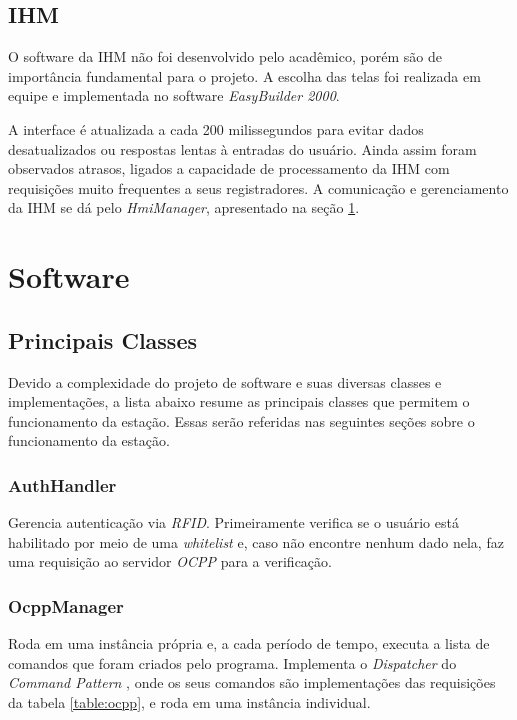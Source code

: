     \subsection{IHM}
    \label{methodology:structure:others}

      O software da \ac{IHM} não foi desenvolvido pelo acadêmico, porém são de importância fundamental para o projeto. A escolha das telas foi realizada em equipe e implementada no software \textit{EasyBuilder 2000}. {}

      A interface é atualizada a cada 200 milissegundos para evitar dados desatualizados ou respostas lentas à entradas do usuário. Ainda assim foram observados atrasos, ligados a capacidade de processamento da \ac{IHM} com requisições muito frequentes a seus registradores. A comunicação e gerenciamento da \ac{IHM} se dá pelo \textit{HmiManager}, apresentado na seção \ref{methodology:structure:sw}.

  \section{Software}
  \label{methodology:structure:sw}

    \subsection{Principais Classes}

    Devido a complexidade do projeto de software e suas diversas classes e implementações, a lista abaixo resume as principais classes que permitem o funcionamento da estação. Essas serão referidas nas seguintes seções sobre o funcionamento da estação. 

        \subsubsection{AuthHandler}
          Gerencia autenticação via \textit{\textit{\ac{RFID}}}. Primeiramente verifica se o usuário está habilitado por meio de uma \textit{whitelist} e, caso não encontre nenhum dado nela, faz uma requisição ao servidor \textit{\ac{OCPP}} para a verificação.
        \subsubsection{OcppManager}
          Roda em uma instância própria e, a cada período de tempo, executa a lista de comandos que foram criados pelo programa. Implementa o \textit{Dispatcher} do \textit{Command Pattern} \cite{book-gof}, onde os seus comandos são implementações das requisições da tabela \ref{table:ocpp}, e roda em uma instância individual.
